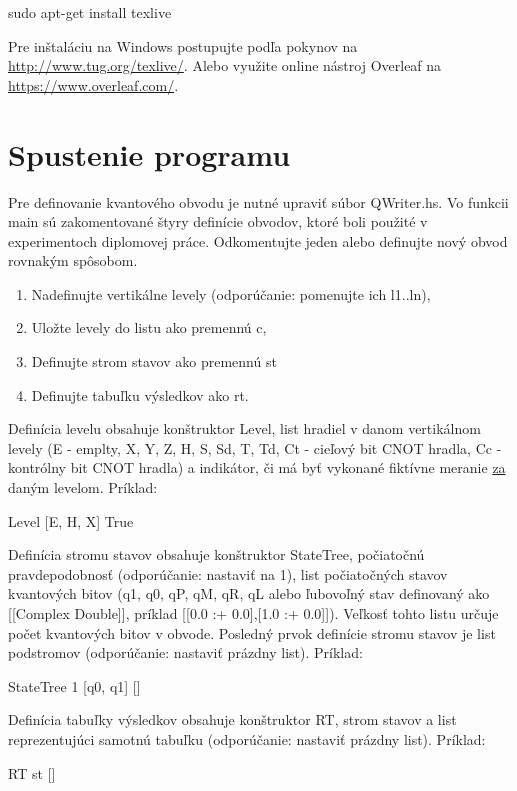 \begin{code}
sudo apt-get install texlive
\end{code}

Pre inštaláciu na Windows postupujte podľa pokynov na \url{http://www.tug.org/texlive/}. Alebo využite online nástroj Overleaf na \url{https://www.overleaf.com/}.

\section{Spustenie programu}

Pre definovanie kvantového obvodu je nutné upraviť súbor QWriter.hs. Vo 
funkcii main sú zakomentované štyry definície obvodov, ktoré boli použité 
v experimentoch diplomovej práce. Odkomentujte jeden alebo definujte nový
obvod rovnakým spôsobom. 

\begin{enumerate}
    \item Nadefinujte vertikálne levely (odporúčanie: pomenujte ich l1..ln),
    \item Uložte levely do listu ako premennú c,
    \item Definujte strom stavov ako premennú st
    \item Definujte tabuľku výsledkov ako rt.
\end{enumerate}

Definícia levelu obsahuje konštruktor Level, list hradiel v danom vertikálnom
levely (E - emplty, X, Y, Z, H, S, Sd, T, Td, Ct - cieľový bit CNOT hradla, 
Cc - kontrólny bit CNOT hradla) a indikátor, či má byť vykonané fiktívne
meranie \underline{za} daným levelom. Príklad:

\begin{code}
Level [E, H, X] True
\end{code}

Definícia stromu stavov obsahuje konštruktor StateTree, počiatočnú 
pravdepodobnosť (odporúčanie: nastaviť na 1), list počiatočných stavov
kvantových bitov (q1, q0, qP, qM, qR, qL alebo ľubovoľný stav definovaný
ako [[Complex Double]], príklad [[0.0 :+ 0.0],[1.0 :+ 0.0]]). 
Veľkosť tohto listu určuje počet kvantových bitov v obvode. Posledný prvok
definície stromu stavov je list podstromov (odporúčanie: nastaviť prázdny list).
Príklad:

\begin{code}
StateTree 1 [q0, q1] []
\end{code}

Definícia tabuľky výsledkov obsahuje konštruktor RT, strom stavov a list 
reprezentujúci samotnú tabuľku (odporúčanie: nastaviť prázdny list). Príklad:

\begin{code}
RT st []
\end{code}
